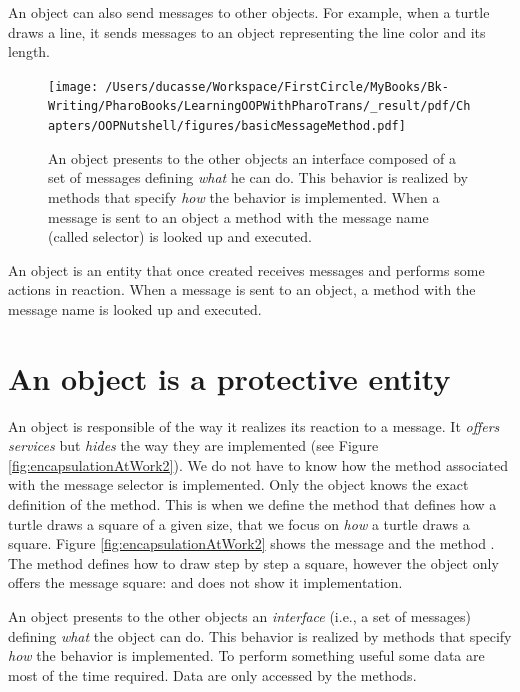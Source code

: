 \documentclass[10pt,twoside,english]{_support/latex/sbabook/sbabook}
\begin{document}
An object can also send messages to other objects. For example, when a turtle draws a line, it sends messages to an object representing the line color and its length.


\begin{figure}

\begin{center}
\texttt{[image: /Users/ducasse/Workspace/FirstCircle/MyBooks/Bk-Writing/PharoBooks/LearningOOPWithPharoTrans/\_result/pdf/Chapters/OOPNutshell/figures/basicMessageMethod.pdf]}\caption{An object presents to the other objects an interface composed of a set of messages defining \textit{what} he can do. This behavior is realized by methods that specify \textit{how} the behavior is implemented. When a message is sent to an object a method with the message name (called selector) is looked up and executed. \label{basicMessageMethod}}\end{center}
\end{figure}


\begin{coffee}
An object is an entity that once created receives messages and performs some actions in reaction. When a message is sent to an object, a method with the message name is looked up and executed.
\end{coffee}
\section{An object is a protective entity}
An object is responsible of the way it realizes its reaction to a message.  It \textit{offers services} but \textit{hides} the way they are implemented (see Figure \ref{fig:encapsulationAtWork2}). We do not have to know how the method associated with the message selector is implemented.  Only the object knows the exact definition of the method.  This is when we define the method  that defines how a turtle draws a square of a given size, that we focus on \textit{how} a turtle draws a square. Figure \ref{fig:encapsulationAtWork2} shows the message and the method . The method  defines how to draw step by step a square, however the object only offers the message square: and does not show it implementation.

\begin{important}
An object presents to the other objects an \textit{interface} (i.e., a set of messages) defining \textit{what} the object can do. This behavior is realized by methods that specify \textit{how} the behavior is implemented. To perform something useful some data are most of the time required. Data are only accessed by the methods.
\end{important}
\end{document}

